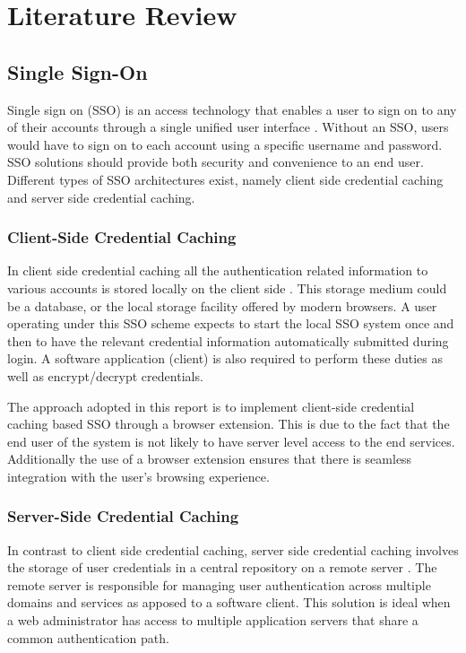 \section{Literature Review}

\subsection{Single Sign-On}
Single sign on (SSO) is an access technology that enables a user to sign on to any of their accounts through a single unified user interface \cite{sso1}. Without an SSO, users would have to sign on to each account using a specific username and password. SSO solutions should provide both security and convenience to an end user. Different types of SSO architectures exist, namely client side credential caching and server side credential caching. 

\subsubsection{Client-Side Credential Caching}
In client side credential caching all the authentication related information to various accounts is stored locally on the client side \cite{sso2}. This storage medium could be a database, or the local storage facility offered by modern browsers. A user operating under this SSO scheme expects to start the local SSO system once and then to have the relevant credential information automatically submitted during login. A software application (client) is also required to perform these duties as well as encrypt/decrypt credentials. 

The approach adopted in this report is to implement client-side credential caching based SSO through a browser extension. This is due to the fact that the end user of the system is not likely to have server level access to the end services. Additionally the use of a browser extension ensures that there is seamless integration with the user's browsing experience.

\subsubsection{Server-Side Credential Caching}
In contrast to client side credential caching, server side credential caching involves the storage of user credentials in a central repository on a remote server \cite{sso2}. The remote server is responsible for managing user authentication across multiple domains and services as apposed to a software client. This solution is ideal when a web administrator has access to multiple application servers that share a common authentication path.


